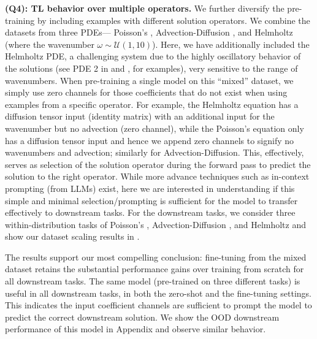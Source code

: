\medskip
\noindent \textbf{(Q4): TL behavior over multiple operators.}
We further diversify the pre-training by including examples with different solution operators. 
We combine the datasets from three PDEs--- Poisson's \sysAonefive{}, Advection-Diffusion \sysBzeropttwoone{}, and Helmholtz \sysConeten{} (where the wavenumber $\omega \sim \mathcal{U}(1,10)$). Here, we have additionally included the Helmholtz PDE, a challenging system due to the highly oscillatory behavior of the solutions (see PDE 2 in  and , for examples), very sensitive to the range of wavenumbers.
When pre-training a single model on this ``mixed'' dataset, we simply use zero channels for those coefficients that do not exist when using examples from a specific operator. For example, the Helmholtz equation has a diffusion tensor input (identity matrix) with an additional input for the wavenumber but no advection (zero channel), while the Poisson's equation only has a diffusion tensor input and hence we append zero channels to signify no wavenumbers and advection; similarly for Advection-Diffusion.
This, effectively, serves as selection of the solution operator during the forward pass to predict the solution to the right operator.
While more advance techniques such as in-context prompting (from LLMs) exist, here we are interested in understanding if this simple and minimal selection/prompting is sufficient for the model to transfer effectively to downstream tasks. 
For the downstream tasks, we consider three within-distribution tasks of Poisson's \sysAonetwoptfive{}, Advection-Diffusion \sysBzeropttwozeroptfour{}, and Helmholtz \sysConefive{} and show our dataset scaling results in . 

The results support our most compelling conclusion: fine-tuning from the mixed dataset retains the substantial performance gains over training from scratch for all downstream tasks. The same model (pre-trained on three different tasks) is useful in all downstream tasks, in both the zero-shot and the fine-tuning settings. This indicates the input coefficient channels are sufficient to prompt the model to predict the correct downstream solution. 
We show the OOD downstream performance of this model in Appendix  and observe similar behavior.


